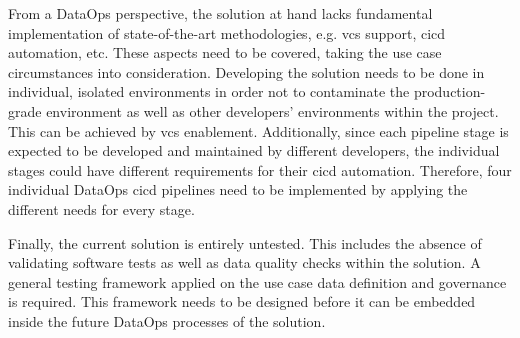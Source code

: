 From a DataOps perspective, the solution at hand lacks fundamental implementation of state-of-the-art methodologies, e.g. \ac{vcs} support, \ac{cicd} automation, etc. These aspects need to be covered, taking the use case circumstances into consideration. Developing the solution needs to be done in individual, isolated environments in order not to contaminate the production-grade environment as well as other developers' environments within the project. This can be achieved by \ac{vcs} enablement. Additionally, since each pipeline stage is expected to be developed and maintained by different developers, the individual stages could have different requirements for their \ac{cicd} automation. Therefore, four individual DataOps \ac{cicd} pipelines need to be implemented by applying the different needs for every stage.

Finally, the current solution is entirely untested. This includes the absence of validating software tests as well as data quality checks within the solution. A general testing framework applied on the use case data definition and governance is required. This framework needs to be designed before it can be embedded inside the future DataOps processes of the solution.
